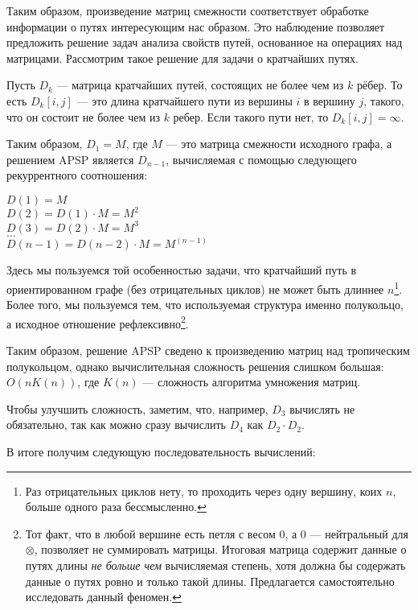 Таким образом, произведение матриц смежности соответствует обработке информации о путях интересующим нас образом. Это наблюдение позволяет предложить решение задач анализа свойств путей, основанное на операциях над матрицами. Рассмотрим такое решение для задачи о кратчайших путях.

Пусть $D_k$ --- матрица кратчайших путей, состоящих не более чем из $k$ рёбер. То есть $D_k[i,j]$ --- это длина кратчайшего пути из вершины $i$ в вершину $j$, такого, что он состоит не более чем из $k$ ребер. Если такого пути нет, то $D_k[i,j] = \infty$.

Таким образом, $D_1 = M$, где $M$ --- это матрица смежности исходного графа, а решением APSP является $D_{n-1}$, вычисляемая с помощью следующего рекуррентного соотношения:

\begin{center}
    $D(1) = M$ \\
    $D(2) = D(1) \cdot M = M^2$ \\
    $D(3) = D(2) \cdot M = M^3$ \\
    $\dots$ \\
    $D(n-1) = D(n-2) \cdot M = M^{(n - 1)}$ \\
\end{center}

Здесь мы пользуемся той особенностью задачи, что кратчайший путь в ориентированном графе (без отрицательных циклов) не может быть длиннее $n$\footnote{Раз отрицательных циклов нету, то проходить через одну вершину, коих $n$, больше одного раза бессмысленно.}.
Более того, мы пользуемся тем, что используемая структура именно полукольцо, а исходное отношение рефлексивно\footnote{Тот факт, что в любой вершине есть петля с весом 0, а 0 --- нейтральный для $\otimes$, позволяет не суммировать матрицы. Итоговая матрица содержит данные о путях длины \textit{не больше чем} вычисляемая степень, хотя должна бы содержать данные о путях ровно и только такой длины. Предлагается самостоятельно исследовать данный феномен.}.

Таким образом, решение APSP сведено к произведению матриц над тропическим полукольцом, однако вычислительная сложность решения слишком большая: $O(n K(n))$, где $K(n)$ --- сложность алгоритма умножения матриц.

Чтобы улучшить сложность, заметим, что, например, $D_3$ вычислять не обязательно, так как можно сразу вычислить $D_4$ как $D_2 \cdot D_2$.

В итоге получим следующую последовательность вычислений:

